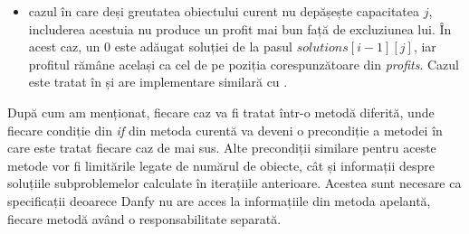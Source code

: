 \begin{sloppypar}
\begin{itemize}
\begin{Verbatim}[commandchars=\\\{\}]
\PY{n}{currentSolution} \PY{o}{:=} \PY{n}{currentSolution} \PY{o}{+} \PY{p}{[}\PY{l+m+mi}{1}\PY{p}{]}\PY{p}{;}
\end{Verbatim}
        Caz tratat în metoda .
        \item cazul în care deși greutatea obiectului curent nu depășește capacitatea $j$, includerea acestuia nu produce un profit mai bun față de excluziunea lui. În acest caz, un 0 este adăugat soluției de la pasul $\textit{solutions}[i - 1][j]$, iar profitul rămâne același ca cel de pe poziția corespunzătoare din \textit{profits}. Cazul este tratat în  și are implementare similară cu .
    \end{itemize}
    După cum am menționat, fiecare caz va fi tratat într-o metodă diferită, unde fiecare condiție din \textit{if} din metoda curentă va deveni o precondiție a metodei în care este tratat fiecare caz de mai sus. Alte precondiții similare pentru aceste metode vor fi limitările legate de numărul de obiecte, cât și informații despre soluțiile subproblemelor calculate în iterațiile anterioare. Acestea sunt necesare ca specificații deoarece Danfy nu are acces la informațiile din metoda apelantă, fiecare metodă având o responsabilitate separată.

\end{sloppypar}